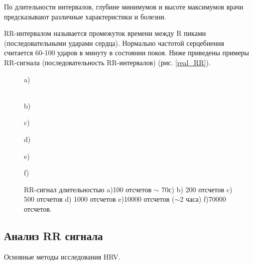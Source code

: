 По длительности интервалов, глубине минимумов и высоте максимумов врачи предсказывают различные характеристики и болезни.

RR-интервалом называется промежуток времени между R пиками (последовательными ударами сердца). Нормально частотой серцебиения считается 60-100 ударов в минуту в состоянии покоя. Ниже приведены примеры RR-сигнала (последовательность RR-интервалов) (рис. \ref{real_RR}).

\begin{figure}[h]
	\begin{minipage}[h]{0.47\linewidth}
		\center{\texttt{[image: rr\_100]}} a) \\
	\end{minipage}
	\hfill
	\begin{minipage}[h]{0.47\linewidth}
		\center{\texttt{[image: rr\_200]}} \\b)
	\end{minipage}
	\vfill
	\begin{minipage}[h]{0.47\linewidth}
		\center{\texttt{[image: rr\_500]}} c) \\
	\end{minipage}
	\hfill
	\begin{minipage}[h]{0.47\linewidth}
		\center{\texttt{[image: rr\_1000]}} d) \\
	\end{minipage}
	\begin{minipage}[h]{0.47\linewidth}
		\center{\texttt{[image: rr\_10000]}} e) \\
	\end{minipage}
	\hfill
	\begin{minipage}[h]{0.47\linewidth}
		\center{\texttt{[image: rr\_70000]}} f) \\
	\end{minipage}
	\caption{RR-сигнал длительностью a)100 отсчетов $\sim$ 70с) b) 200 отсчетов
		c) 500 отсчетов d) 1000 отсчетов e)10000 отсчетов ($\sim $2 часа) f)70000 отсчетов.}
	\label{ris:reaal_RR}
\end{figure}


\subsection{Анализ RR сигнала}

Основные методы исследования HRV.

